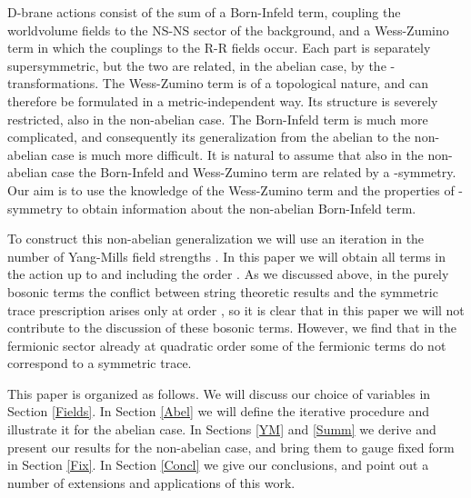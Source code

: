 \documentclass[12pt,a4paper]{article}
\begin{document}
D-brane actions consist of the sum of a Born-Infeld term, coupling the
worldvolume fields to the NS-NS sector of the background,
and a Wess-Zumino term in which
the couplings to the R-R fields occur. Each part is separately
supersymmetric, but the two are related, in the abelian case,
by the \myHighlight{$\kappa$}\coordHE{}-transformations. The
Wess-Zumino term is of a topological nature, and can therefore
be formulated in a metric-independent way. Its structure is
severely restricted, also in the non-abelian case. The Born-Infeld term
is much more complicated, and consequently its generalization from
the abelian to the non-abelian case is much more difficult. It is
natural to assume that also in the non-abelian case the
Born-Infeld and Wess-Zumino term are related by a
\myHighlight{$\kappa$}\coordHE{}-symmetry. Our
aim is to use the knowledge of the Wess-Zumino term and the
properties of \myHighlight{$\kappa$}\coordHE{}-symmetry to obtain information about the
non-abelian Born-Infeld term.

To construct this non-abelian generalization we
will use an iteration in the number of Yang-Mills field strengths
\coordHE{}. In this paper
we will obtain all terms in the action up to and including the order \coordHE{}.
As we discussed
above, in the purely
bosonic terms the conflict between string theoretic
results and the symmetric trace prescription arises only at order
\coordHE{}, so it is clear that in this paper we will not
contribute to the discussion of these bosonic terms.
However, we find that in the fermionic sector already  at
quadratic order some of the fermionic terms
do not correspond to a symmetric trace.

This paper is organized as follows. We will discuss our choice of variables
in Section \ref{Fields}.
In Section \ref{Abel} we will define the iterative procedure and
illustrate it for the abelian case. In Sections \ref{YM}
and \ref{Summ} we derive and present our results
for the non-abelian case,
and bring them to gauge fixed form in Section \ref{Fix}.
In Section \ref{Concl}
we give our conclusions, and
point out a number of extensions and applications of this work.
\end{document}
